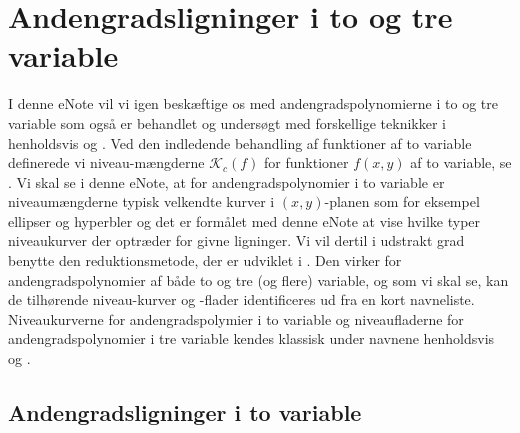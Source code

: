 

\setcounter{chapter}{19} %


\chapter{Andengradsligninger i to og tre  variable} \label{tn20}




\begin{basis}
I denne eNote vil vi igen beskæftige os med andengradspolynomierne i to og tre variable
som også er behandlet og undersøgt med forskellige teknikker i henholdsvis  og  .
Ved den indledende behandling af funktioner af to variable definerede vi niveau-mængderne $\mathcal{K}_{c}(f)$ for funktioner $f(x,y)$ af to variable, se .
Vi skal se i denne eNote, at for andengradspolynomier i to variable er niveaumængderne typisk velkendte kurver i $(x,y)$-planen som for  eksempel
ellipser og hyperbler og det er formålet med denne eNote at vise hvilke typer niveaukurver der optræder for givne ligninger. Vi vil dertil i udstrakt grad benytte den reduktionsmetode, der er udviklet i . Den virker for andengradspolynomier af både to og tre (og flere) variable, og som vi skal se, kan de tilhørende niveau-kurver og -flader identificeres ud fra en kort navneliste. Niveaukurverne for andengradspolymier i to variable og niveaufladerne for andengradspolynomier i tre variable  kendes klassisk under navnene henholdsvis  og .
\end{basis}





\section{Andengradsligninger i to variable}

